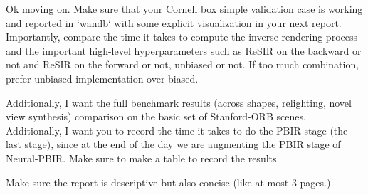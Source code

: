 Ok moving on. Make sure that your Cornell box simple validation case is working and reported in `wandb` with some explicit visualization in your next report. Importantly, compare the time it takes to compute the inverse rendering process and the important high-level hyperparameters such as ReSIR on the backward or not and ReSIR on the forward or not, unbiased or not. If too much combination, prefer unbiased implementation over biased.

Additionally, I want the full benchmark results (across shapes, relighting, novel view synthesis) comparison on the basic set of Stanford-ORB scenes. Additionally, I want you to record the time it takes to do the PBIR stage (the last stage), since at the end of the day we are augmenting the PBIR stage of Neural-PBIR. Make sure to make a table to record the results.


Make sure the report is descriptive but also concise (like at most 3 pages.)



